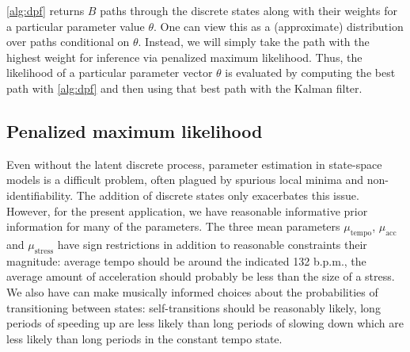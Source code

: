 \documentclass[aoas]{imsart}
\begin{document}
\autoref{alg:dpf} returns $B$ paths through the discrete states along with their weights for a 
particular parameter value $\theta$. One
can view this as a (approximate) distribution over paths conditional
on $\theta$. Instead, we will simply take the path with the highest
weight for inference via penalized maximum likelihood. Thus, the
likelihood of a particular parameter vector $\theta$ is evaluated by
computing the best path with \autoref{alg:dpf} and then using that best
path with the Kalman filter.%

\subsection{Penalized maximum likelihood}
\label{sec:penal-maxim-likel}

Even without the latent discrete process, parameter estimation in
state-space models is a difficult problem, often plagued by spurious
local minima and non-identifiability. The addition of discrete states
only exacerbates this issue. However, for the present application, we
have reasonable informative prior information for many of the
parameters. The three mean parameters $\mu_{\textrm{tempo}}$,
$\mu_{\textrm{acc}}$ and $\mu_{\textrm{stress}}$ have sign
restrictions in addition to reasonable constraints their magnitude:
average tempo should be around the indicated 132 b.p.m., the average
amount of acceleration should probably be less than the size of a
stress. We also have can make musically informed choices about the
probabilities of transitioning between states: self-transitions should
be reasonably likely, long periods of speeding up are less likely than
long periods of slowing down which are less likely than long periods
in the constant tempo state.
\end{document}
